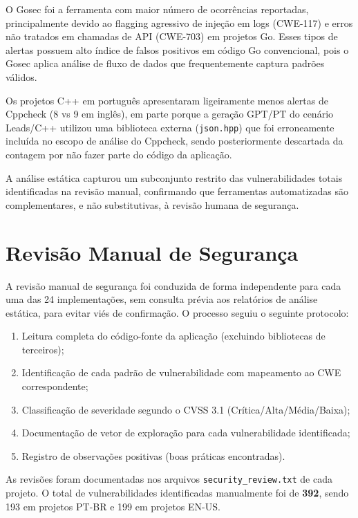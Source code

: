 \documentclass[12pt]{article}
\begin{document}
O Gosec foi a ferramenta com maior número de ocorrências reportadas, principalmente devido ao flagging agressivo de injeção em logs (CWE-117) e erros não tratados em chamadas de API (CWE-703) em projetos Go. Esses tipos de alertas possuem alto índice de falsos positivos em código Go convencional, pois o Gosec aplica análise de fluxo de dados que frequentemente captura padrões válidos.

Os projetos C++ em português apresentaram ligeiramente menos alertas de Cppcheck (8 vs 9 em inglês), em parte porque a geração GPT/PT do cenário Leads/C++ utilizou uma biblioteca externa (\texttt{json.hpp}) que foi erroneamente incluída no escopo de análise do Cppcheck, sendo posteriormente descartada da contagem por não fazer parte do código da aplicação.

A análise estática capturou um subconjunto restrito das vulnerabilidades totais identificadas na revisão manual, confirmando que ferramentas automatizadas são complementares, e não substitutivas, à revisão humana de segurança.

\section{Revisão Manual de Segurança}
\label{sec:manual}

A revisão manual de segurança foi conduzida de forma independente para cada uma das 24 implementações, sem consulta prévia aos relatórios de análise estática, para evitar viés de confirmação. O processo seguiu o seguinte protocolo:

\begin{enumerate}
  \item Leitura completa do código-fonte da aplicação (excluindo bibliotecas de terceiros);
  \item Identificação de cada padrão de vulnerabilidade com mapeamento ao CWE correspondente;
  \item Classificação de severidade segundo o CVSS 3.1 (Crítica/Alta/Média/Baixa);
  \item Documentação de vetor de exploração para cada vulnerabilidade identificada;
  \item Registro de observações positivas (boas práticas encontradas).
\end{enumerate}

As revisões foram documentadas nos arquivos \texttt{security\_review.txt} de cada projeto. O total de vulnerabilidades identificadas manualmente foi de \textbf{392}, sendo 193 em projetos PT-BR e 199 em projetos EN-US.
\end{document}
